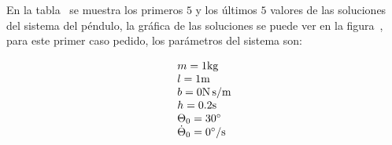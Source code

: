 
En la tabla~ se muestra los primeros $5$ y los últimos $5$ valores de las soluciones del sistema del péndulo, la gráfica de las soluciones se puede ver en la figura~, para este primer caso pedido, los parámetros del sistema son:

\begin{equation*}
                \begin{array}{ll}
                  m = 1 \si[per-mode=symbol]{\kilo\gram} \\
                  l = 1 \si[per-mode=symbol]{\meter} \\  
                  b = 0 \si[per-mode=symbol]{\newton\second\per\meter} \\ 
                  h = 0.2 \si[per-mode=symbol]{\second} \\   
                  \Theta_{0} = 30 \si[per-mode=symbol]{\degree} \\  
                  \dot{\Theta}_{0} = 0 \si[per-mode=symbol]{\degree\per\second} \\            
                \end{array}
\end{equation*}







